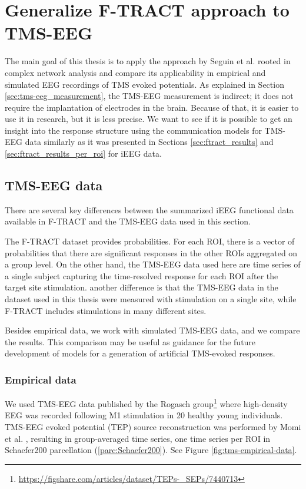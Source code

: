 \chapter{Generalize F-TRACT approach to TMS-EEG}\label{ch:pytepfit}

The main goal of this thesis is to apply the approach by Seguin et al. \cite{seguin_communication_2023} rooted in complex network analysis and compare its applicability in empirical and simulated EEG recordings of TMS evoked potentials. As explained in Section \ref{sec:tms-eeg_measurement}, the TMS-EEG measurement is indirect; it does not require the implantation of electrodes in the brain. Because of that, it is easier to use it in research, but it is less precise. We want to see if it is possible to get an insight into the response structure using the communication models for TMS-EEG data similarly as it was presented in Sections \ref{sec:ftract_results} and \ref{sec:ftract_results_per_roi} for iEEG data. 

\section{TMS-EEG data}\label{sec:reponse_definition}

There are several key differences between the summarized iEEG functional data available in F-TRACT and the TMS-EEG data used in this section. 

The F-TRACT dataset provides probabilities. For each ROI, there is a vector of probabilities that there are significant responses in the other ROIs aggregated on a group level. On the other hand, the TMS-EEG data used here are time series of a single subject capturing the time-resolved response for each ROI after the target site stimulation. another difference is that the TMS-EEG data in the dataset used in this thesis were measured with stimulation on a single site, while F-TRACT includes stimulations in many different sites.

Besides empirical data, we work with simulated TMS-EEG data, and we compare the results. This comparison may be useful as guidance for the future development of models for a generation of artificial TMS-evoked responses.

\subsection{Empirical data}

We used TMS-EEG data published by the Rogasch group\footnote{\url{https://figshare.com/articles/dataset/TEPs-_SEPs/7440713}} \cite{biabani_characterizing_2019} where high-density EEG was recorded following M1 stimulation in 20 healthy young individuals. TMS-EEG evoked potential (TEP) source reconstruction was performed by Momi et al. \cite{momi_tms-evoked_2023}, resulting in group-averaged time series, one time series per ROI in Schaefer200 parcellation (\ref{parc:Schaefer200}). See Figure \ref{fig:tms-empirical-data}. 

